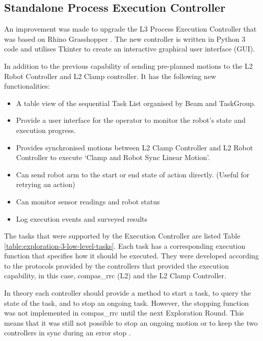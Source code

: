 \subsection{Standalone Process Execution Controller}
\label{subsection:exploration-3-standalone-process-execution-controller}

An improvement was made to upgrade the L3 Process Execution Controller that was based on Rhino Grasshopper . The new controller is written in Python 3 code and utilises Tkinter to create an interactive graphical user interface (GUI).




In addition to the previous capability of sending pre-planned motions to the L2 Robot Controller and L2 Clamp controller. It has the following new functionalities:

\begin{itemize}
	\item A table view of the sequential Task List organised by Beam and TaskGroup. 

	\item Provide a user interface for the operator to monitor the robot's state and execution progress.

	\item Provides synchronised motions between L2 Clamp Controller and L2 Robot Controller to execute ‘Clamp and Robot Sync Linear Motion’.

	\item Can send robot arm to the start or end state of action directly. (Useful for retrying an action)

	\item Can monitor sensor readings and robot status

	\item Log execution events and surveyed results

\end{itemize}
The tasks that were supported by the Execution Controller are listed Table \ref{table:exploration-3-low-level-tasks}. Each task has a corresponding execution function that specifies how it should be executed. They were developed according to the protocols provided by the controllers that provided the execution capability, in this case, compas\_rrc (L2) and the L2 Clamp Controller. 

In theory each controller should provide a method to start a task, to query the state of the task, and to stop an ongoing task. However, the stopping function was not implemented in compas\_rrc until the next Exploration Round. This means that it was still not possible to stop an ongoing motion or to keep the two controllers in sync during an error stop .

